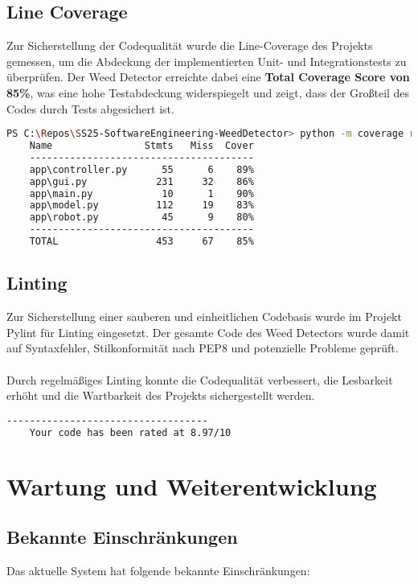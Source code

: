 \documentclass[12pt, a4paper]{scrreprt}
\begin{document}
\newpage


\section{Line Coverage}
Zur Sicherstellung der Codequalität wurde die Line-Coverage des Projekts gemessen, um die Abdeckung der implementierten Unit- und Integrationstests zu überprüfen. Der Weed Detector erreichte dabei eine \textbf{Total Coverage Score von 85\%}, was eine hohe Testabdeckung widerspiegelt und zeigt, dass der Großteil des Codes durch Tests abgesichert ist.\\

\begin{lstlisting}[language=Bash, caption=Line Coverage]
PS C:\Repos\SS25-SoftwareEngineering-WeedDetector> python -m coverage report
    Name                Stmts   Miss  Cover
    ---------------------------------------
    app\controller.py      55      6    89%
    app\gui.py            231     32    86%
    app\main.py            10      1    90%
    app\model.py          112     19    83%
    app\robot.py           45      9    80%
    ---------------------------------------
    TOTAL                 453     67    85%
\end{lstlisting}

\section{Linting}
Zur Sicherstellung einer sauberen und einheitlichen Codebasis wurde im Projekt Pylint für Linting eingesetzt. Der gesamte Code des Weed Detectors wurde damit auf Syntaxfehler, Stilkonformität nach PEP8 und potenzielle Probleme geprüft.\\
\\
Durch regelmäßiges Linting konnte die Codequalität verbessert, die Lesbarkeit erhöht und die Wartbarkeit des Projekts sichergestellt werden.\\

\begin{lstlisting}[language=Bash, caption=Pylint Score]
    -----------------------------------
    Your code has been rated at 8.97/10
\end{lstlisting} 


\chapter{Wartung und Weiterentwicklung}

\section{Bekannte Einschränkungen}
Das aktuelle System hat folgende bekannte Einschränkungen:
\end{document}
